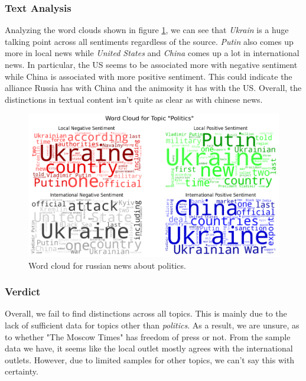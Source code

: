 \documentclass{article}
\theoremstyle{mytheoremstyle}
\theoremstyle{mytheoremstyle}
\theoremstyle{myproblemstyle}
\begin{document}
    \subsubsection{Text Analysis}

    Analyzing the word clouds shown in figure \ref{fig:russian_sentiment_score_wordcloud}, we can see that \emph{Ukrain} is a huge talking point across all sentiments regardless of the source. \emph{Putin} also comes up more in local news while \emph{United States} and \emph{China} comes up a lot in international news. In particular, the US seems to be associated more with negative sentiment while China is associated with more positive sentiment. This could indicate the alliance Russia has with China and the animosity it has with the US. Overall, the distinctions in textual content isn't quite as clear as with chinese news.

    \begin{figure}[hp]
        \centering
        \includegraphics[width=\linewidth]{../images/plots/Russia/russia_wordcloud_politics.png}
        \caption{Word cloud for russian news about politics.}
        \label{fig:russian_sentiment_score_wordcloud}
    \end{figure}

    \subsubsection{Verdict}

    Overall, we fail to find distinctions across all topics. This is mainly due to the lack of sufficient data for topics other than \emph{politics}. As a result, we are unsure, as to whether "The Moscow Times" has freedom of press or not. From the sample data we have, it seems like the local outlet mostly agrees with the international outlets. However, due to limited samples for other topics, we can't say this with certainty.
\end{document}
